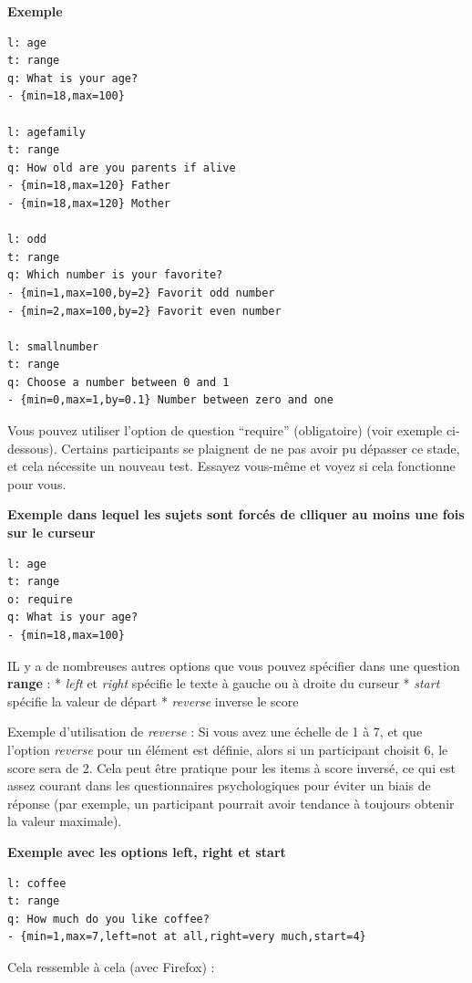 \documentclass[
]{book}
\begin{document}
\textbf{Exemple}

\begin{verbatim}
l: age
t: range
q: What is your age?
- {min=18,max=100}

l: agefamily
t: range
q: How old are you parents if alive
- {min=18,max=120} Father
- {min=18,max=120} Mother

l: odd
t: range
q: Which number is your favorite?
- {min=1,max=100,by=2} Favorit odd number
- {min=2,max=100,by=2} Favorit even number

l: smallnumber
t: range
q: Choose a number between 0 and 1
- {min=0,max=1,by=0.1} Number between zero and one
\end{verbatim}

Vous pouvez utiliser l'option de question ``require'' (obligatoire)
(voir exemple ci-dessous). Certains participants se plaignent de ne pas
avoir pu dépasser ce stade, et cela nécessite un nouveau test. Essayez
vous-même et voyez si cela fonctionne pour vous.

\textbf{Exemple dans lequel les sujets sont forcés de clliquer au moins
une fois sur le curseur}

\begin{verbatim}
l: age
t: range
o: require
q: What is your age?
- {min=18,max=100}
\end{verbatim}

IL y a de nombreuses autres options que vous pouvez spécifier dans une
question \textbf{range} : * \emph{left} et \emph{right} spécifie le
texte à gauche ou à droite du curseur * \emph{start} spécifie la valeur
de départ * \emph{reverse} inverse le score

Exemple d'utilisation de \emph{reverse} : Si vous avez une échelle de 1
à 7, et que l'option \emph{reverse} pour un élément est définie, alors
si un participant choisit 6, le score sera de 2. Cela peut être pratique
pour les items à score inversé, ce qui est assez courant dans les
questionnaires psychologiques pour éviter un biais de réponse (par
exemple, un participant pourrait avoir tendance à toujours obtenir la
valeur maximale).

\textbf{Exemple avec les options left, right et start}

\begin{verbatim}
l: coffee
t: range
q: How much do you like coffee?
- {min=1,max=7,left=not at all,right=very much,start=4}
\end{verbatim}

Cela ressemble à cela (avec Firefox) :
\end{document}
